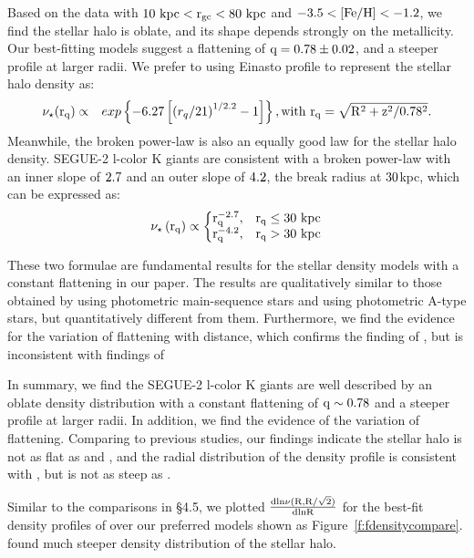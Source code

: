 \documentclass[12pt,preprint]{aastex}
\newcommand{\feh}{{\rm [Fe/H]}}
\begin{document}
Based on the data with $\rm 10~kpc<r_{gc}<80~kpc$ and $\rm -3.5<\feh<-1.2$, we find the stellar halo is oblate, and its shape depends strongly on the metallicity. Our best-fitting models suggest a flattening of $\rm q=0.78\pm0.02$, and a steeper profile at larger radii. We prefer to using Einasto profile to represent the stellar halo density as:
\begin{eqnarray}
\rm \nu_{\star}(r_q) &\propto& exp\left\{-6.27\left[\left(r_q/21\right )^{1/2.2}-1\right ]\right\}, \rm with~r_q=\sqrt{R^2+z^2/0.78^2}.
 \end{eqnarray}
Meanwhile, the broken power-law is also an equally good law for the stellar halo density. SEGUE-2 l-color K giants are consistent with a broken power-law with an inner slope of $\rm 2.7$ and an outer slope of $\rm 4.2$, the break radius at $\rm 30$kpc, which can be expressed as:
\begin{equation}
\rm \nu_\star\left(r_q \right )\propto \left\{\begin{matrix} \rm r_q^{-2.7}, & \rm r_q\leq 30~kpc \\ \rm r_q^{-4.2},&\rm r_q>30~kpc \end{matrix}\right.
\end{equation}

These two formulae are fundamental results for the stellar density models with a constant flattening in our paper. The results are qualitatively similar to those obtained by \citet{Sesar2011} using photometric main-sequence stars and \citet{Deason2011} using photometric A-type stars, but quantitatively different from them. Furthermore, we find the evidence for the variation of flattening with distance, which confirms the finding of \citet{Preston1991}, but is inconsistent with findings of \citet{Sluis1998, Sesar2011,Deason2011}   

In summary, we find the SEGUE-2 l-color K giants are well described by an oblate density distribution with a constant flattening of $\rm q \sim 0.78$ and a steeper profile at larger radii. In addition, we find the evidence of the variation of flattening. Comparing to previous studies, our findings indicate the stellar halo is not as flat as \citet[;q=0.7]{Sesar2011} and \citet[;q=0.58]{Deason2011}, and the radial distribution of the density profile is consistent with \citet{Sesar2011}, but is not as steep as \citet{Deason2011,Deason2014}. 

Similar to the comparisons in \S 4.5, we plotted $\rm \frac{dln\nu(R,R/\sqrt{2})}{dlnR}$ for the best-fit density profiles of \citet{Deason2011,Deason2014} over our preferred models shown as Figure~\ref{f:fdensitycompare}. \citet{Deason2011,Deason2014} found much steeper density distribution of the stellar halo.
\end{document}
